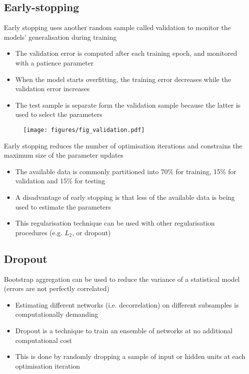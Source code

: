 \documentclass[c]{beamer}
\begin{document}
\subsection{Early-stopping}

\begin{frame}{\secsubname}
	Early stopping uses another random sample called validation to monitor the  models' generalisation during training
	\begin{itemize}
		\item The validation error is computed after each training epoch, and monitored with a patience parameter
		\item When the model starts overfitting, the training error decreases while the validation error increases
		\item The test sample is separate form the validation sample because the latter is used to select the parameters
	\end{itemize}
\end{frame}

\begin{frame}{\secsubname}
	\begin{figure}
		\texttt{[image: figures/fig\_validation.pdf]}
	\end{figure}
\end{frame}

\begin{frame}{\secsubname}
	Early stopping reduces the number of optimisation iterations and constrains the maximum size of the parameter updates
	\begin{itemize}
		\item The available data is commonly partitioned into 70\% for training, 15\% for validation and 15\% for testing
		\item A disadvantage of early stopping is that less of the available data is being used to estimate the parameters
		\item This regularisation technique can be used with other regularisation procedures (e.g. $L_2$, or dropout)
	\end{itemize}
\end{frame}

\subsection{Dropout}

\begin{frame}{\secsubname}
	Bootstrap aggregation can be used to reduce the variance of a statistical model (errors are not perfectly correlated)
	\begin{itemize}
		\item Estimating different networks (i.e. decorrelation) on different subsamples is computationally demanding
		\item Dropout \parencite{Srivastava2014} is a technique to train an ensemble of networks at no additional computational cost
		\item This is done by randomly dropping a sample of input or hidden units at each optimisation iteration
	\end{itemize}
\end{frame}
\end{document}
